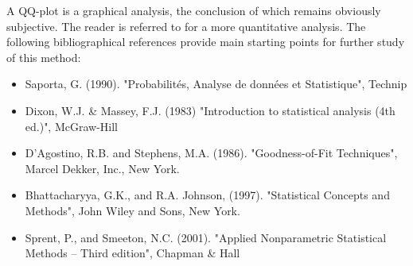             {
              A QQ-plot is a graphical analysis, the conclusion of which remains obviously subjective. The reader is referred to  for a more quantitative analysis.
              The following bibliographical references provide main starting points for further study of this method:
              \begin{itemize}
              \item Saporta, G. (1990). "Probabilités, Analyse de données et Statistique", Technip
              \item Dixon, W.J. \& Massey, F.J. (1983) "Introduction to statistical analysis (4th ed.)", McGraw-Hill
              \item D'Agostino, R.B. and Stephens, M.A. (1986). "Goodness-of-Fit Techniques", Marcel Dekker, Inc., New York.
              \item Bhattacharyya, G.K., and R.A. Johnson, (1997). "Statistical Concepts and Methods", John Wiley and Sons, New York.
              \item Sprent, P., and Smeeton, N.C. (2001). "Applied Nonparametric Statistical Methods -- Third edition", Chapman \& Hall
            \end{itemize}}
